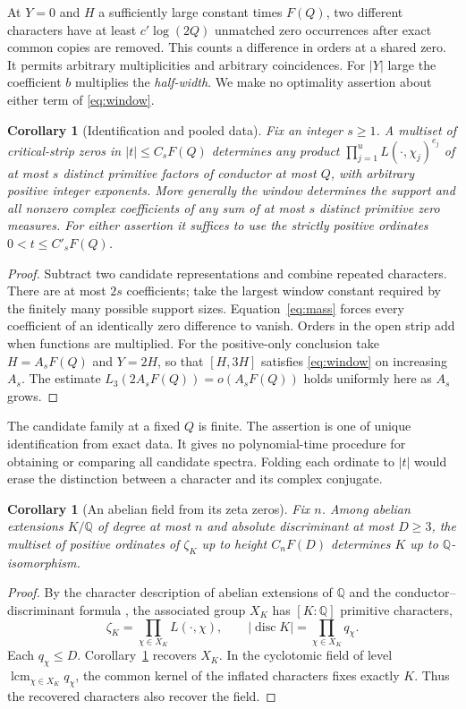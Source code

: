 \documentclass[11pt]{article}
\newtheorem{corollary}[theorem]{Corollary}
\begin{document}
At $Y=0$ and $H$ a sufficiently large constant times $F(Q)$, two different characters have at least $c'\log(2Q)$ unmatched zero occurrences after exact common copies are removed. This counts a difference in orders at a shared zero. It permits arbitrary multiplicities and arbitrary coincidences. For $|Y|$ large the coefficient $b$ multiplies the \emph{half-width}. We make no optimality assertion about either term of \eqref{eq:window}.

\begin{corollary}[Identification and pooled data]\label{cor:pooled}
Fix an integer $s\ge1$. A multiset of critical-strip zeros in $|t|\le C_s F(Q)$ determines any product $\prod_{j=1}^u L(\cdot,\chi_j)^{e_j}$ of at most $s$ distinct primitive factors of conductor at most $Q$, with arbitrary positive integer exponents. More generally the window determines the support and all nonzero complex coefficients of any sum of at most $s$ distinct primitive zero measures. For either assertion it suffices to use the strictly positive ordinates $0<t\le C'_s F(Q)$.
\end{corollary}
\begin{proof}
Subtract two candidate representations and combine repeated characters. There are at most $2s$ coefficients; take the largest window constant required by the finitely many possible support sizes. Equation~\eqref{eq:mass} forces every coefficient of an identically zero difference to vanish. Orders in the open strip add when functions are multiplied. For the positive-only conclusion take $H=A_s F(Q)$ and $Y=2H$, so that $[H,3H]$ satisfies \eqref{eq:window} on increasing $A_s$. The estimate $L_3(2A_sF(Q))=o(A_sF(Q))$ holds uniformly here as $A_s$ grows.
\end{proof}
The candidate family at a fixed $Q$ is finite. The assertion is one of unique identification from exact data. It gives no polynomial-time procedure for obtaining or comparing all candidate spectra. Folding each ordinate to $|t|$ would erase the distinction between a character and its complex conjugate.


\begin{corollary}[An abelian field from its zeta zeros]\label{cor:field}
Fix $n$. Among abelian extensions $K/\mathbb Q$ of degree at most $n$ and absolute discriminant at most $D\ge3$, the multiset of positive ordinates of $\zeta_K$ up to height $C_n F(D)$ determines $K$ up to $\mathbb Q$-isomorphism.
\end{corollary}
\begin{proof}
By the character description of abelian extensions of $\mathbb Q$ and the conductor--discriminant formula \cite[Ch.~3]{wash}, the associated group $X_K$ has $[K:\mathbb Q]$ primitive characters,
\[
 \zeta_K=\prod_{\chi\in X_K} L(\cdot,\chi),\qquad
 |\operatorname{disc} K|=\prod_{\chi\in X_K}q_\chi .
\]
Each $q_\chi\le D$. Corollary~\ref{cor:pooled} recovers $X_K$. In the cyclotomic field of level $\operatorname{lcm}_{\chi\in X_K}q_\chi$, the common kernel of the inflated characters fixes exactly $K$. Thus the recovered characters also recover the field.
\end{proof}
\end{document}
